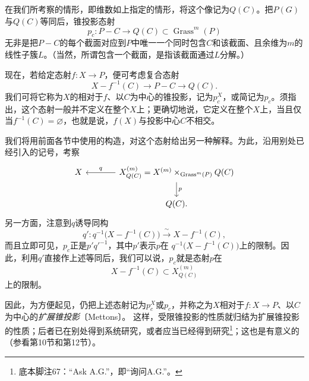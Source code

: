 在我们所考察的情形，即维数如上指定的情形，将这个像记为$Q(C)$。把$P(G)$与$Q(C)$等同后，锥投影态射
\[
p_c:P-C\longrightarrow Q(C)\subset\operatorname{Grass}^{m}(P)
\]
无非是把$P-C$的每个截面对应到$P$中唯一一个同时包含$C$和该截面、且余维为$m$的线性子簇$L$。（当然，所谓包含一个截面，是指该截面通过$L$分解。）

现在，若给定态射$f:X\to P$，便可考虑复合态射
\[
X-f^{-1}(C)\longrightarrow P-C\longrightarrow Q(C).
\]
我们可将它称为$X$的相对于$f$、以$C$为中心的锥投影，记为$p_c^X$，或简记为$p_c$。须指出，这个态射一般并不定义在整个$X$上；更确切地说，它定义在整个$X$上，当且仅当$f^{-1}(C)=\varnothing$，也就是说，$f(X)$与投影中心$C$不相交。

我们将用前面各节中使用的构造，对这个态射给出另一种解释。为此，沿用别处已经引入的记号，考察
\[
\begin{tikzcd}[column sep=large]
X & X^{(m)}_{Q(C)}
   =X^{(m)}\times_{\operatorname{Grass}^{m}(P)}Q(C)
   \arrow[l,"q"'] \arrow[d,"p"] \\
  & Q(C).
\end{tikzcd}
\]
另一方面，注意到$q$诱导同构
\[
q':q^{-1}\bigl(X-f^{-1}(C)\bigr)
\xrightarrow{\ \sim\ }X-f^{-1}(C),
\]
而且立即可见，$p_c$正是$p'q'^{-1}$，其中$p'$表示$p$在
$q^{-1}\bigl(X-f^{-1}(C)\bigr)$上的限制。因此，利用$q'$直接作上述等同后，我们可以说，$p_c$就是态射$p$在
\[
X-f^{-1}(C)\subset X^{(m)}_{Q(C)}
\]
上的限制。

因此，为方便起见，仍把上述态射记为$p_c^X$或$p_c$，并称之为$X$相对于$f:X\to P$、以$C$为中心的\emph{扩展锥投影}〔Mettons〕。
这样，受限锥投影的性质就归结为扩展锥投影的性质；后者已在别处得到系统研究，或者应当已经得到研究\footnote{底本脚注67：“Ask A.G.”，即“询问A.G.”。}；这也是有意义的（参看第10节和第12节）。

